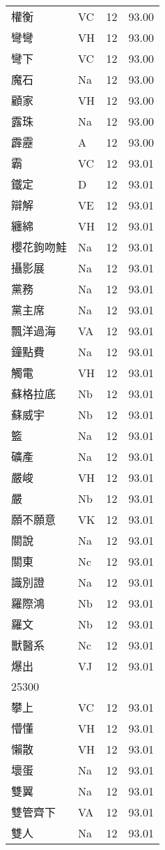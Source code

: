 \documentclass[twocolumn]{book}
\begin{document}
\begin{supertabular}{llrr}
權衡 & VC & 12 &  93.00\\
彎彎 & VH & 12 &  93.00\\
彎下 & VC & 12 &  93.00\\
魔石 & Na & 12 &  93.00\\
顧家 & VH & 12 &  93.00\\
露珠 & Na & 12 &  93.00\\
霹靂 & A & 12 &  93.00\\
霸 & VC & 12 &  93.01\\
鐵定 & D & 12 &  93.01\\
辯解 & VE & 12 &  93.01\\
纏綿 & VH & 12 &  93.01\\
櫻花鉤吻鮭 & Na & 12 &  93.01\\
攝影展 & Na & 12 &  93.01\\
黨務 & Na & 12 &  93.01\\
黨主席 & Na & 12 &  93.01\\
飄洋過海 & VA & 12 &  93.01\\
鐘點費 & Na & 12 &  93.01\\
觸電 & VH & 12 &  93.01\\
蘇格拉底 & Nb & 12 &  93.01\\
蘇威宇 & Nb & 12 &  93.01\\
籃 & Na & 12 &  93.01\\
礦產 & Na & 12 &  93.01\\
嚴峻 & VH & 12 &  93.01\\
嚴 & Nb & 12 &  93.01\\
願不願意 & VK & 12 &  93.01\\
關說 & Na & 12 &  93.01\\
關東 & Nc & 12 &  93.01\\
識別證 & Na & 12 &  93.01\\
羅際鴻 & Nb & 12 &  93.01\\
羅文 & Nb & 12 &  93.01\\
獸醫系 & Nc & 12 &  93.01\\
爆出 & VJ & 12 &  93.01\\
25300\\
攀上 & VC & 12 &  93.01\\
懵懂 & VH & 12 &  93.01\\
懶散 & VH & 12 &  93.01\\
壞蛋 & Na & 12 &  93.01\\
雙翼 & Na & 12 &  93.01\\
雙管齊下 & VA & 12 &  93.01\\
雙人 & Na & 12 &  93.01\\

\end{supertabular}
\end{document}
